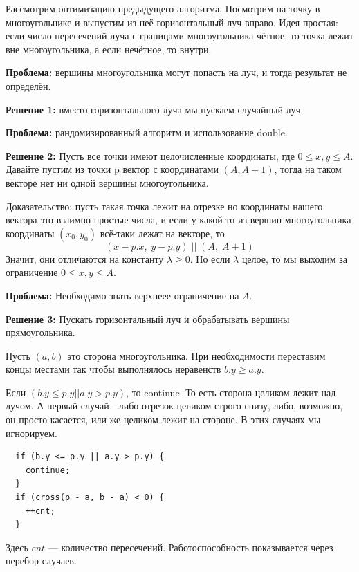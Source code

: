Рассмотрим оптимизацию предыдущего алгоритма. 
Посмотрим на точку в многоугольнике и выпустим из неё горизонтальный луч вправо. Идея простая: если число пересечений луча с границами многоугольника чётное, то точка лежит вне многоугольника, а если нечётное, то внутри. 

\par \textbf{Проблема:} вершины многоугольника могут попасть на луч, и тогда результат не определён.

\par \textbf{Решение 1:} вместо горизонтального луча мы пускаем случайный луч.
\par \textbf{Проблема:} рандомизированный алгоритм и использование double.

\par \textbf{Решение 2:} Пусть все точки имеют целочисленные координаты, где $0 \leq x, y \leq A$. Давайте пустим из точки p вектор с координатами $(A, A+1)$, тогда на таком векторе нет ни одной вершины многоугольника.

Доказательство: пусть такая точка лежит на отрезке но координаты нашего вектора это взаимно простые числа, и если у какой-то из вершин многоугольника координаты $(x_0, y_0)$ всё-таки лежат на векторе, то 
\[(x - p.x,\; y- p.y) \;|| \;(A, \;A+1)\]
Значит, они отличаются на константу $\lambda \geq 0$. Но если $\lambda$ целое, то мы выходим за ограничение $0 \leq x, y \leq A$.
\par \textbf{Проблема:} Необходимо знать верхнеее ограничение на $A$.

\par \textbf{Решение 3:} Пускать горизонтальный луч и обрабатывать вершины прямоугольника.

Пусть $(a, b)$ это сторона многоугольника. При необходимости переставим концы местами так чтобы выполнялось неравенств $b.y \geq a.y$.

Если $(b.y \leq p.y || a.y > p.y)$, то continue. То есть сторона целиком лежит над лучом. А первый случай - либо отрезок целиком строго снизу, либо, возможно, он просто касается, или же целиком лежит на стороне. В этих случаях мы игнорируем.


\begin{lstlisting}
  if (b.y <= p.y || a.y > p.y) {
    continue;
  }
  if (cross(p - a, b - a) < 0) {
    ++cnt;
  }
\end{lstlisting}

Здесь $cnt$ — количество пересечений. Работоспособность показывается через перебор случаев.

